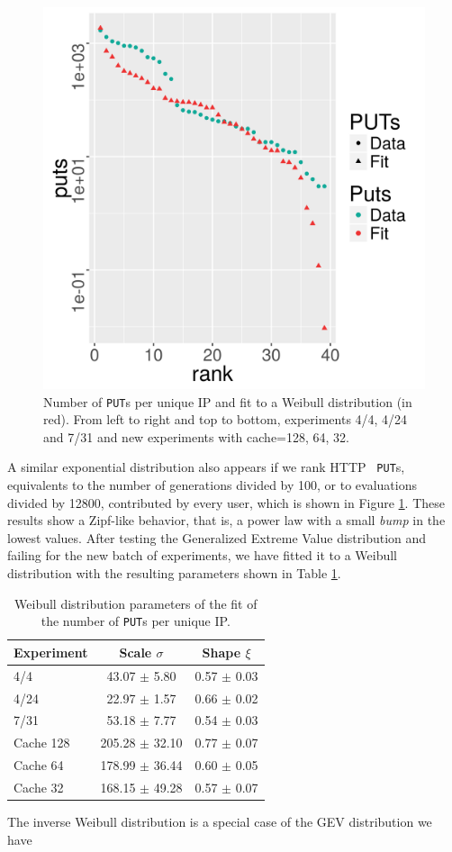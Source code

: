 \documentclass[letterpaper]{article}
\begin{document}
\begin{figure}[!htb]
\includegraphics[width=0.32\linewidth]{weibull-fit-cache=32.png}
\caption{Number of {\tt PUT}s per unique IP and fit to a Weibull
  distribution (in red). From left to right and top to bottom, experiments
  4/4, 4/24 and 7/31 and new experiments with cache=128, 64, 32.} 
\label{fig:puts:os}
\end{figure}
%
A similar exponential distribution also appears if we rank HTTP {\tt
  PUT}s, equivalents to the number of 
generations divided by 100, or to evaluations divided by 12800,
contributed by every user, which is shown 
in Figure \ref{fig:puts:os}. These results show a Zipf-like behavior,
that is, a power law with a small {\em bump} in the lowest
values. After testing the Generalized Extreme Value distribution and
failing for the new batch of experiments, we have fitted it to a
Weibull distribution \cite{thoman1969inferences} with the resulting
parameters shown in Table \ref{tab:puts:os}. 
%
\begin{table}
\caption{Weibull distribution  parameters of the fit of
  the number of {\tt PUT}s per unique IP. \label{tab:puts:os}}
\begin{center}
\begin{tabular}{l|cc}
\hline
Experiment  &  Scale $\sigma$ & Shape $\xi$ \\
\hline
4/4 &  43.07 $\pm$ 5.80 &  0.57 $\pm$ 0.03 \\
4/24 & 22.97 $\pm$ 1.57 & 0.66 $\pm$  0.02  \\
7/31 &  53.18 $\pm$ 7.77 &  0.54 $\pm$ 0.03   \\
\hline
Cache 128 & 205.28 $\pm$ 32.10 & 0.77 $\pm$ 0.07 \\ 
Cache 64 & 178.99 $\pm$ 36.44 & 0.60 $\pm$ 0.05 \\ 
Cache 32 & 168.15 $\pm$ 49.28 & 0.57 $\pm$ 0.07 \\
\hline
\end{tabular}
\end{center}
\end{table}
%
The inverse
Weibull distribution is a special case of the GEV distribution we have
\end{document}
